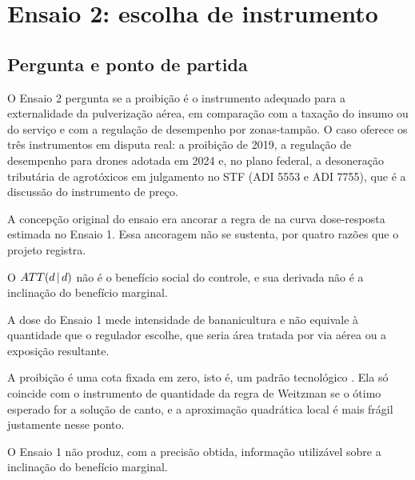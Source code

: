
\chapter{Ensaio 2: escolha de instrumento}
\label{cap:ensaio2}

\section{Pergunta e ponto de partida}
\label{sec:e2-pergunta}

O Ensaio 2 pergunta se a proibição é o instrumento adequado para a
externalidade da pulverização aérea, em comparação com a taxação do insumo ou
do serviço e com a regulação de desempenho por zonas-tampão. O caso oferece os
três instrumentos em disputa real: a proibição de 2019, a regulação de
desempenho para drones adotada em 2024 e, no plano federal, a desoneração
tributária de agrotóxicos em julgamento no STF (ADI 5553 e ADI 7755), que é a
discussão do instrumento de preço.

A concepção original do ensaio era ancorar a regra de \citet{weitzman1974} na
curva dose-resposta estimada no Ensaio 1. Essa ancoragem não se sustenta, por
quatro razões que o projeto registra.

\begin{alineas}
  \item O $ATT(d\,|\,d)$ não é o benefício social do controle, e sua derivada não é a
    inclinação do benefício marginal.
  \item A dose do Ensaio 1 mede intensidade de bananicultura e não equivale à
    quantidade que o regulador escolhe, que seria área tratada por via aérea ou
    a exposição resultante.
  \item A proibição é uma cota fixada em zero, isto é, um padrão tecnológico
    \cite{helfand1991}. Ela só coincide com o instrumento de quantidade da
    regra de Weitzman se o ótimo esperado for a solução de canto, e a
    aproximação quadrática local é mais frágil justamente nesse ponto.
  \item O Ensaio 1 não produz, com a precisão obtida, informação utilizável
    sobre a inclinação do benefício marginal.
\end{alineas}

